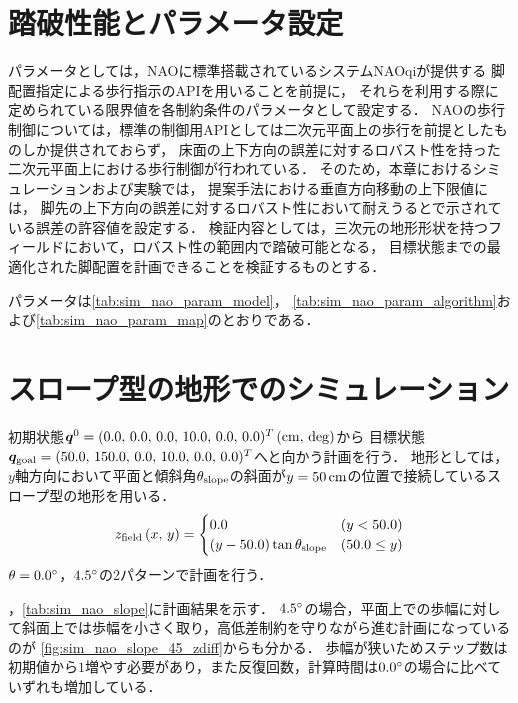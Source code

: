 \documentclass[autodetect-engine,dvipdfmx-if-dvi,ja=standard,a4j,jbase=11pt,magstyle=nomag*]{bxjsreport}
\begin{document}
\section{踏破性能とパラメータ設定}
パラメータとしては，NAOに標準搭載されているシステムNAOqiが提供する
脚配置指定による歩行指示のAPIを用いることを前提に，
それらを利用する際に定められている限界値を各制約条件のパラメータとして設定する\cite{nao_footstep}．
NAOの歩行制御については，標準の制御用APIとしては二次元平面上の歩行を前提としたものしか提供されておらず，
床面の上下方向の誤差に対するロバスト性を持った二次元平面上における歩行制御が行われている\cite{nao_feature}．
そのため，本章におけるシミュレーションおよび実験では，
提案手法における垂直方向移動の上下限値には，
脚先の上下方向の誤差に対するロバスト性において耐えうると\cite{nao_feature}で示されている誤差の許容値を設定する．
検証内容としては，三次元の地形形状を持つフィールドにおいて，ロバスト性の範囲内で踏破可能となる，
目標状態までの最適化された脚配置を計画できることを検証するものとする．

パラメータは\cref{tab:sim_nao_param_model}，
\cref{tab:sim_nao_param_algorithm}および\cref{tab:sim_nao_param_map}のとおりである．



\section{スロープ型の地形でのシミュレーション}
\label{sec:sim_nao_slope}
初期状態$\bm{q}^0 = ( 0.0 ,\, 0.0 ,\, 0.0 ,\, 10.0 ,\, 0.0 ,\, 0.0 )^T\,(\si{\centi\meter} ,\, \mathrm{deg})$から
目標状態$\bm{q}_{\mathrm{goal}} = ( 50.0 ,\, 150.0 ,\, 0.0 ,\, 10.0 ,\, 0.0 ,\, 0.0 )^T$へと向かう計画を行う．
地形としては，$y$軸方向において平面と傾斜角$\theta_{\mathrm{slope}}$の斜面が$y = 50\,\si{\centi\meter}$の位置で接続しているスロープ型の地形を用いる．
\begin{equation}
    z_{\mathrm{field}}\left( x ,\, y \right) =
        \begin{cases}
            0.0 & \left( y < 50.0 \right) \\
            \left( y - 50.0 \right) \tan \theta_{\mathrm{slope}} & \left( 50.0 \leq y \right)
        \end{cases}
\end{equation}
$\theta = 0.0\degree$，$4.5\degree$の2パターンで計画を行う．


，\cref{tab:sim_nao_slope}に計画結果を示す．
$4.5\degree$の場合，平面上での歩幅に対して斜面上では歩幅を小さく取り，高低差制約を守りながら進む計画になっているのが
\cref{fig:sim_nao_slope_45_zdiff}からも分かる．
歩幅が狭いためステップ数は初期値から$1$増やす必要があり，また反復回数，計算時間は$0.0\degree$の場合に比べていずれも増加している．
\end{document}
